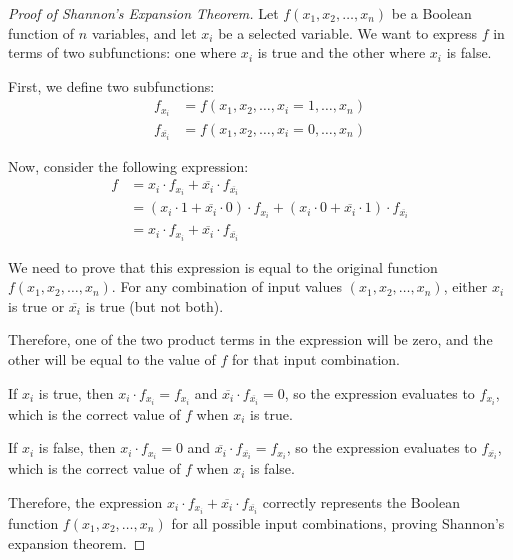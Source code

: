     \begin{proof}[Proof of Shannon's Expansion Theorem]
        Let $f(x_1, x_2, \ldots, x_n)$ be a Boolean function of $n$ variables, and let $x_i$ be a selected variable. We want to express $f$ in terms of two subfunctions: one where $x_i$ is true and the other where $x_i$ is false.
        
        First, we define two subfunctions:
        \begin{align*}
        f_{x_i} &= f(x_1, x_2, \ldots, x_i=1, \ldots, x_n) \\
        f_{\overline{x_i}} &= f(x_1, x_2, \ldots, x_i=0, \ldots, x_n)
        \end{align*}
        
        Now, consider the following expression:
        \begin{align*}
        f &= x_i \cdot f_{x_i} + \overline{x_i} \cdot f_{\overline{x_i}} \\
           &= (x_i \cdot 1 + \overline{x_i} \cdot 0) \cdot f_{x_i} + (x_i \cdot 0 + \overline{x_i} \cdot 1) \cdot f_{\overline{x_i}} \\
           &= x_i \cdot f_{x_i} + \overline{x_i} \cdot f_{\overline{x_i}}
        \end{align*}
        
        We need to prove that this expression is equal to the original function $f(x_1, x_2, \ldots, x_n)$.
        For any combination of input values $(x_1, x_2, \ldots, x_n)$, either $x_i$ is true or $\overline{x_i}$ is true (but not both). 
        
        Therefore, one of the two product terms in the expression will be zero, and the other will be equal to the value of $f$ for that input combination.

        If $x_i$ is true, then $x_i \cdot f_{x_i} = f_{x_i}$ and $\overline{x_i} \cdot f_{\overline{x_i}} = 0$, so the expression evaluates to $f_{x_i}$, which is the correct value of $f$ when $x_i$ is true.      

        If $x_i$ is false, then $x_i \cdot f_{x_i} = 0$ and $\overline{x_i} \cdot f_{\overline{x_i}} = f_{{x_i}}$, so the expression evaluates to $f_{\overline{x_i}}$, which is the correct value of $f$ when $x_i$ is false.

        Therefore, the expression $x_i \cdot f_{x_i} + \overline{x_i} \cdot f_{\overline{x_i}}$ correctly represents the Boolean function $f(x_1, x_2, \ldots, x_n)$ for all possible input combinations, proving Shannon's expansion theorem.
        \end{proof}
        
